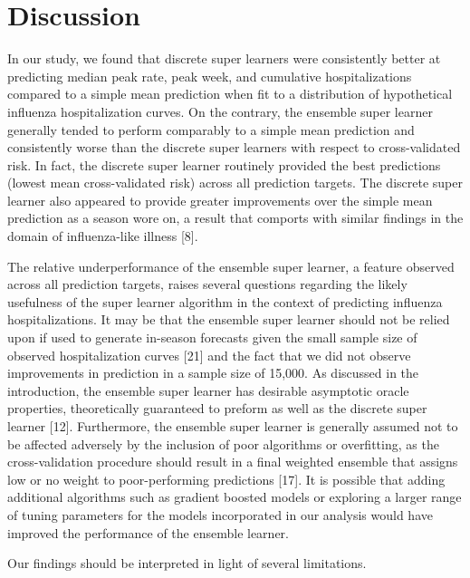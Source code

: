 \documentclass[10pt,letterpaper]{article}
\begin{document}
\hypertarget{discussion}{%
\section{Discussion}\label{discussion}}

In our study, we found that discrete super learners were consistently
better at predicting median peak rate, peak week, and cumulative
hospitalizations compared to a simple mean prediction when fit to a
distribution of hypothetical influenza hospitalization curves. On the
contrary, the ensemble super learner generally tended to perform
comparably to a simple mean prediction and consistently worse than the
discrete super learners with respect to cross-validated risk. In fact,
the discrete super learner routinely provided the best predictions
(lowest mean cross-validated risk) across all prediction targets. The
discrete super learner also appeared to provide greater improvements
over the simple mean prediction as a season wore on, a result that
comports with similar findings in the domain of influenza-like illness
{[}8{]}.

The relative underperformance of the ensemble super learner, a feature
observed across all prediction targets, raises several questions
regarding the likely usefulness of the super learner algorithm in the
context of predicting influenza hospitalizations. It may be that the
ensemble super learner should not be relied upon if used to generate
in-season forecasts given the small sample size of observed
hospitalization curves {[}21{]} and the fact that we did not observe
improvements in prediction in a sample size of 15,000. As discussed in
the introduction, the ensemble super learner has desirable asymptotic
oracle properties, theoretically guaranteed to preform as well as the
discrete super learner {[}12{]}. Furthermore, the ensemble super learner
is generally assumed not to be affected adversely by the inclusion of
poor algorithms or overfitting, as the cross-validation procedure should
result in a final weighted ensemble that assigns low or no weight to
poor-performing predictions {[}17{]}. It is possible that adding
additional algorithms such as gradient boosted models or exploring a
larger range of tuning parameters for the models incorporated in our
analysis would have improved the performance of the ensemble learner.

Our findings should be interpreted in light of several limitations.
\end{document}
